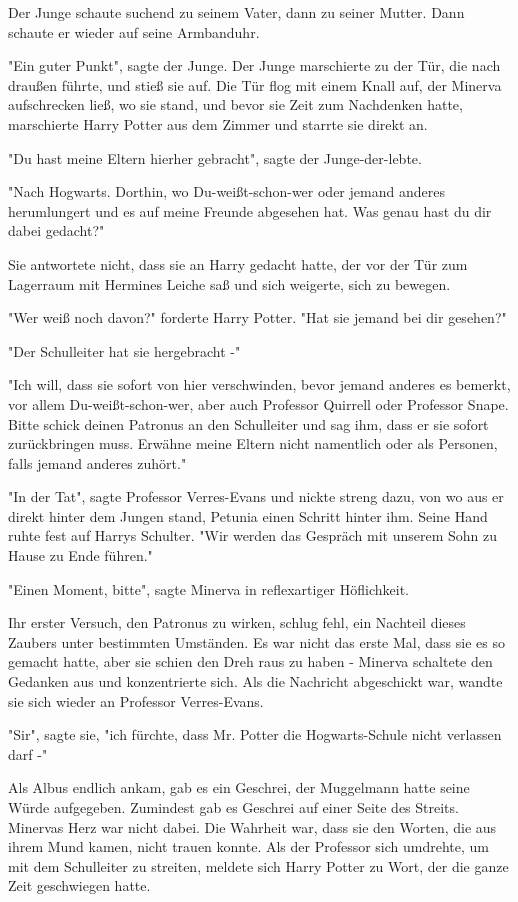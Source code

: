 {Der Junge schaute suchend zu seinem Vater, dann zu seiner Mutter. Dann schaute er wieder auf seine Armbanduhr.

"Ein guter Punkt", sagte der Junge. Der Junge marschierte zu der Tür, die nach draußen führte, und stieß sie auf. Die Tür flog mit einem Knall auf, der Minerva aufschrecken ließ, wo sie stand, und bevor sie Zeit zum Nachdenken hatte, marschierte Harry Potter aus dem Zimmer und starrte sie direkt an.

"Du hast meine Eltern hierher gebracht", sagte der Junge-der-lebte.

"Nach Hogwarts. Dorthin, wo Du-weißt-schon-wer oder jemand anderes herumlungert und es auf meine Freunde abgesehen hat. Was genau hast du dir dabei gedacht?"

Sie antwortete nicht, dass sie an Harry gedacht hatte, der vor der Tür zum Lagerraum mit Hermines Leiche saß und sich weigerte, sich zu bewegen.

"Wer weiß noch davon?" forderte Harry Potter. "Hat sie jemand bei dir gesehen?"

"Der Schulleiter hat sie hergebracht -"

"Ich will, dass sie sofort von hier verschwinden, bevor jemand anderes es bemerkt, vor allem Du-weißt-schon-wer, aber auch Professor Quirrell oder Professor Snape. Bitte schick deinen Patronus an den Schulleiter und sag ihm, dass er sie sofort zurückbringen muss. Erwähne meine Eltern nicht namentlich oder als Personen, falls jemand anderes zuhört."

"In der Tat", sagte Professor Verres-Evans und nickte streng dazu, von wo aus er direkt hinter dem Jungen stand, Petunia einen Schritt hinter ihm. Seine Hand ruhte fest auf Harrys Schulter. "Wir werden das Gespräch mit unserem Sohn zu Hause zu Ende führen."

"Einen Moment, bitte", sagte Minerva in reflexartiger Höflichkeit.

Ihr erster Versuch, den Patronus zu wirken, schlug fehl, ein Nachteil dieses Zaubers unter bestimmten Umständen. Es war nicht das erste Mal, dass sie es so gemacht hatte, aber sie schien den Dreh raus zu haben - Minerva schaltete den Gedanken aus und konzentrierte sich. Als die Nachricht abgeschickt war, wandte sie sich wieder an Professor Verres-Evans.

"Sir", sagte sie, "ich fürchte, dass Mr. Potter die Hogwarts-Schule nicht verlassen darf -"

Als Albus endlich ankam, gab es ein Geschrei, der Muggelmann hatte seine Würde aufgegeben. Zumindest gab es Geschrei auf einer Seite des Streits. Minervas Herz war nicht dabei. Die Wahrheit war, dass sie den Worten, die aus ihrem Mund kamen, nicht trauen konnte. Als der Professor sich umdrehte, um mit dem Schulleiter zu streiten, meldete sich Harry Potter zu Wort, der die ganze Zeit geschwiegen hatte.

}
